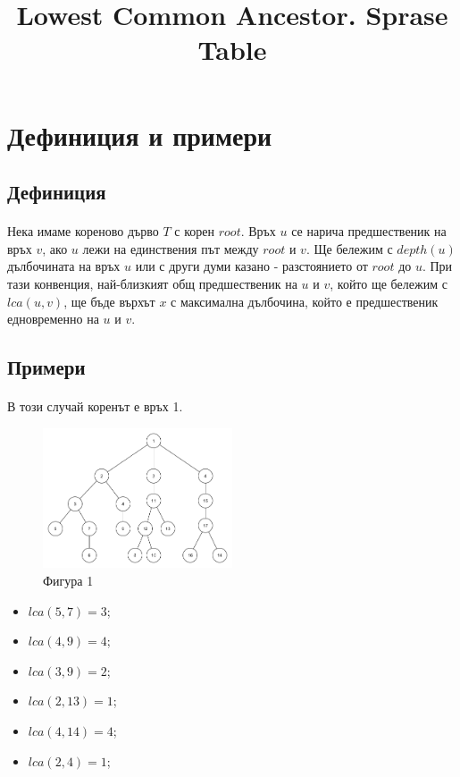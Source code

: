 \documentclass[12pt]{article}
\begin{document}
\title{Lowest Common Ancestor. Sprase Table}
\date{}
\maketitle

\section*{Дефиниция и примери}
\subsection*{Дефиниция}
\paragraph*{}
Нека имаме кореново дърво $T$ с корен $root$. Връх $u$ се нарича предшественик на връх $v$, ако $u$ лежи на единствения път между $root$ и $v$. Ще бележим с $depth(u)$ дълбочината на връх $u$ или с други думи казано - разстоянието от $root$ до $u$. При тази конвенция, най-близкият общ предшественик на $u$ и $v$, който ще бележим с $lca(u, v)$, ще бъде върхът $x$ с максимална дълбочина, който е предшественик едновременно на $u$ и $v$. 
\subsection*{Примери}
\paragraph*{}
В този случай коренът е връх 1.

\begin{figure}[h]
\caption*{Фигура 1}
\centering
\includegraphics[width=0.5\textwidth]{tree1}
\end{figure}

\raggedright
\begin{itemize}
	\item $lca(5, 7) = 3$;
	\item $lca(4, 9) = 4$;
	\item $lca(3, 9) = 2$;
	\item $lca(2, 13) = 1$;
	\item $lca(4, 14) = 4$;
	\item $lca(2, 4) = 1$;
\end{itemize}
\end{document}
